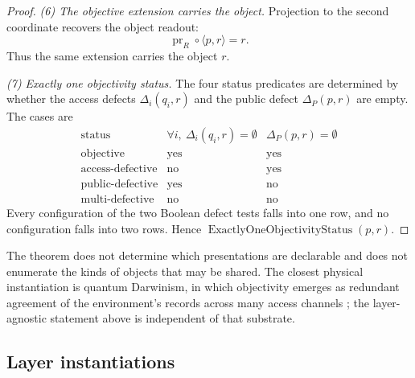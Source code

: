\documentclass[11pt]{article}
\theoremstyle{definition}
\begin{document}
\begin{proof}
\emph{(6) The objective extension carries the object.}
Projection to the second coordinate recovers the object readout:
\[
  \operatorname{pr}_R\circ\langle p,r\rangle=r.
\]
Thus the same extension carries the object \(r\).

\emph{(7) Exactly one objectivity status.}
The four status predicates are determined by whether the access
defects \(\Delta_i(q_i,r)\) and the public defect \(\Delta_P(p,r)\)
are empty.  The cases are
\[
\begin{array}{c|c|c}
\text{status} & \forall i,\ \Delta_i(q_i,r)=\emptyset
  & \Delta_P(p,r)=\emptyset\\
\hline
\text{objective} & \text{yes} & \text{yes}\\
\text{access-defective} & \text{no} & \text{yes}\\
\text{public-defective} & \text{yes} & \text{no}\\
\text{multi-defective} & \text{no} & \text{no}
\end{array}
\]
Every configuration of the two Boolean defect tests falls into one
row, and no configuration falls into two rows.  Hence
\(\operatorname{ExactlyOneObjectivityStatus}(p,r)\).
\end{proof}

The theorem does not determine which presentations are declarable and
does not enumerate the kinds of objects that may be shared.  The
closest physical instantiation is quantum Darwinism, in which
objectivity emerges as redundant agreement of the environment's
records across many access channels \citep{Zurek2009QuantumDarwinism};
the layer-agnostic statement above is independent of that
substrate.

\subsection*{Layer instantiations}\label{layer-inst:F17}
\end{document}
